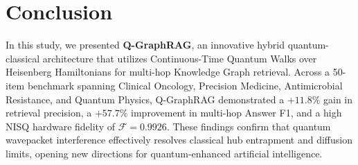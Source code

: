 \documentclass[sn-basic,Numbered]{sn-jnl}
\begin{document}
\section{Conclusion}\label{sec9}
In this study, we presented \textbf{Q-GraphRAG}, an innovative hybrid quantum-classical architecture that utilizes Continuous-Time Quantum Walks over Heisenberg Hamiltonians for multi-hop Knowledge Graph retrieval. Across a 50-item benchmark spanning Clinical Oncology, Precision Medicine, Antimicrobial Resistance, and Quantum Physics, Q-GraphRAG demonstrated a $+11.8\%$ gain in retrieval precision, a $+57.7\%$ improvement in multi-hop Answer F1, and a high NISQ hardware fidelity of $\mathcal{F} = 0.9926$. These findings confirm that quantum wavepacket interference effectively resolves classical hub entrapment and diffusion limits, opening new directions for quantum-enhanced artificial intelligence.
\end{document}
